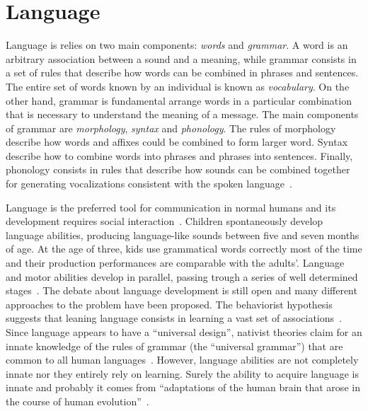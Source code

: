 \section{Language}
\label{sec:speech:language}
Language is relies on two main components: \emph{words} and \emph{grammar}. 
A word is an arbitrary association between a sound and a meaning, while grammar
consists in a set of rules that describe how words can be combined in phrases
and sentences.
The entire set of words known by an individual is known as \emph{vocabulary}. 
On the other hand, grammar is fundamental arrange words in a particular
combination that is necessary to understand the meaning of a message.
The main components of grammar are \emph{morphology}, \emph{syntax} and
\emph{phonology}. The rules of morphology describe how words and affixes could
be combined to form larger word. Syntax describe how to combine words into
phrases and phrases into sentences. Finally, phonology consists in rules that
describe how sounds can be combined together for generating vocalizations
consistent with the spoken language~\citep{kandel.schwartz.jessel:2000}.

Language is the preferred tool for communication in normal humans and its
development requires social interaction~\citep{moskovitz:1978}.
Children spontaneously develop language abilities, producing language-like
sounds between five and seven months of age.
At the age of three, kids use grammatical words correctly most of the time and 
their production performances are comparable with the adults'.
Language and motor abilities develop in parallel, passing trough a series of 
well determined stages~\citep{lennenberg:1967}.
The debate about language development is still open and many different
approaches to the problem have been proposed.
The behaviorist hypothesis suggests that leaning language consists in learning a
vast set of associations~\citep{skinner:1957}.
Since language appears to have a ``universal design'', nativist theories
claim for an innate knowledge of the rules of grammar (the ``universal 
grammar'') that are common to all human languages~\citep{chomsky:1968}.
However, language abilities are not completely innate nor they entirely rely
on learning. 
Surely the ability to acquire language is innate and probably it comes from
``adaptations of the human brain that arose in the course of human
evolution''~\citep{kandel.schwartz.jessel:2000}. 

